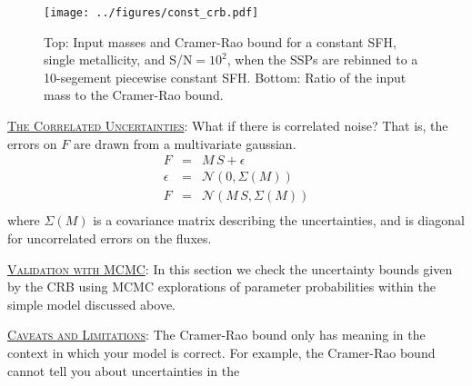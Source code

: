 \documentclass{article}
\begin{document}
\begin{figure*}[h!]
\texttt{[image: ../figures/const\_crb.pdf]}
\caption{Top: Input masses and Cramer-Rao bound for a constant SFH, single metallicity, and S/N$= 10^2$, when the SSPs are rebinned to a 10-segement piecewise constant SFH.  Bottom: Ratio of the input mass to the Cramer-Rao bound. 
\label{fig:example_bin}}
\end{figure*}


\underline{\textsc{The Correlated Uncertainties}}:
What if there is correlated noise? That is, the errors on $F$ are drawn from a multivariate gaussian.
\begin{eqnarray}
F & = & M \, S + \epsilon \\
\epsilon & = & \mathcal{N}(0, \Sigma(M)) \\
F & = & \mathcal{N}(M \, S, \Sigma(M)) \\
\end{eqnarray}
where $\Sigma(M)$ is a covariance matrix describing the uncertainties, and is diagonal for uncorrelated errors on the fluxes.

\underline{\textsc{Validation with MCMC}}:
In this section we check the uncertainty bounds given by the CRB using MCMC explorations of parameter probabilities within the simple model discussed above.


\underline{\textsc{Caveats and Limitations}}:
The Cramer-Rao bound only has meaning in the context in which your model is correct.
For example, the Cramer-Rao bound cannot tell you about uncertainties in the 
\end{document}
